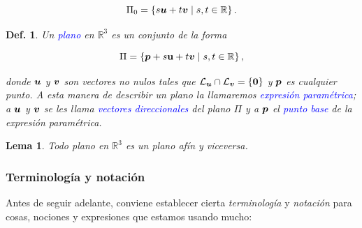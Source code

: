 \documentclass{article}
\theoremstyle{definicion}
\newtheorem{definicion}{Def.}
\theoremstyle{definition}             %
\theoremstyle{definition}             %
\theoremstyle{definition}
\theoremstyle{definition}
\theoremstyle{observacion}
\theoremstyle{definition}
\theoremstyle{plain}
\newtheorem{lemma}{Lema}
\theoremstyle{definition}
\theoremstyle{afirmacion}
\theoremstyle{notation}
\theoremstyle{definition}
\begin{document}
    \begin{equation*}
        \Pi_{0} = \left\lbrace s\vb*{u} + t\vb*{v} \mid s, t \in \mathbb{R}\right\rbrace.
    \end{equation*}


    \begin{definicion}
        Un \textcolor{blue}{plano} en \(\mathbb{R}^{3}\) es un conjunto de la forma

        \begin{equation*}
            \Pi = \left\lbrace \vb*{p} + s\vb{u} + t\vb*{v} \mid s, t \in \mathbb{R}\right\rbrace,
        \end{equation*}

        donde \(\vb*{u}\) y \(\vb*{v}\) son vectores no nulos tales que \(\mathcal{L}_{\vb*{u}} \cap \mathcal{L}_{\vb*{v}} = \left\lbrace \vb*{0}\right\rbrace\) y \(\vb*{p}\) es cualquier punto. A esta manera de describir un plano la llamaremos \textcolor{blue}{expresión paramétrica}; a \(\vb*{u}\) y \(\vb*{v}\) se les llama \textcolor{blue}{vectores direccionales} del plano \(\Pi\) y a \(\vb*{p}\) el \textcolor{blue}{punto base} de la expresión paramétrica.
    \end{definicion}

    \begin{lemma}
        Todo plano en \(\mathbb{R}^{3}\) es un plano afín y viceversa.
    \end{lemma}

    \subsubsection*{Terminología y notación}

    Antes de seguir adelante, conviene establecer cierta \emph{terminología} y \emph{notación} para cosas, nociones y expresiones que estamos usando mucho:
\end{document}
